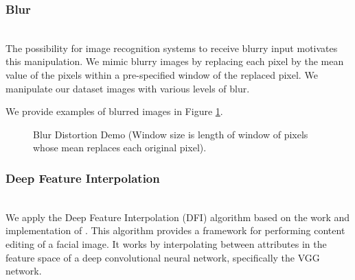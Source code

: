 \documentclass[pageno]{cos429}
\begin{document}
\subsubsection{Blur}\hspace*{\fill} \\
The possibility for image recognition systems to receive blurry input motivates this manipulation. We mimic blurry images by replacing each pixel by the mean value of the pixels within a pre-specified window of the replaced pixel. We manipulate our dataset images with various levels of blur.

We provide examples of blurred images in Figure \ref{fig:manipulationdemo_blur}.
\begin{figure}[!htb]
\caption{Blur Distortion Demo (Window size is length of window of pixels whose mean replaces each original pixel).}
\label{fig:manipulationdemo_blur}
\end{figure}

\subsubsection{Deep Feature Interpolation}\hspace*{\fill} \\
We apply the Deep Feature Interpolation (DFI) algorithm based on the work and implementation of \cite{upchurch_deep_2016}. This algorithm provides a framework for performing content editing of a facial image. It works by interpolating between attributes in the feature space of a deep convolutional neural network, specifically the VGG network.
\end{document}
